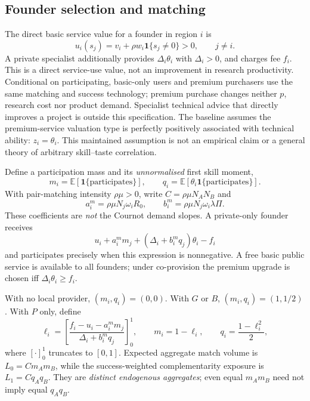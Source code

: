 \documentclass[11pt]{article}
\begin{document}
\subsection{Founder selection and matching}
The direct basic service value for a founder in region $i$ is
\begin{equation}
 u_i(s_j)=v_i+\rho w_i\mathbf1\{s_j\neq0\}>0,\qquad j\ne i.
\end{equation}
A private specialist additionally provides $\Delta_i\theta_i$ with $\Delta_i>0$, and charges fee $f_i$.
This is a direct service-use value, not an improvement in research productivity.
Conditional on participating, basic-only users and premium purchasers use the same matching and success technology; premium purchase changes neither $p$, research cost nor product demand.
Specialist technical advice that directly improves a project is outside this specification. The baseline assumes the premium-service valuation type is perfectly positively associated with technical ability: $z_i=\theta_i$. This maintained assumption is not an empirical claim or a general theory of arbitrary skill--taste correlation.

Define a participation mass and its \emph{unnormalised} first skill moment,
\begin{equation}
 m_i=\mathbb E[\mathbf1\{\mathrm{participates}\}],\qquad
 q_i=\mathbb E[\theta_i\mathbf1\{\mathrm{participates}\}].
 \label{eq:m-q}
\end{equation}
With pair-matching intensity $\rho\mu>0$, write $C=\rho\mu N_AN_B$ and
\begin{equation}
 a_i^m=\rho\mu N_j\omega_i R_0,\qquad
 b_i^m=\rho\mu N_j\omega_i\lambda\Pi.
 \label{eq:matchingcoeff}
\end{equation}
These coefficients are \emph{not} the Cournot demand slopes. A private-only founder receives
\begin{equation}
 u_i+a_i^m m_j+(\Delta_i+b_i^m q_j)\theta_i-f_i
 \label{eq:founderpayoff}
\end{equation}
and participates precisely when this expression is nonnegative. A free basic public service is available to all founders; under co-provision the premium upgrade is chosen iff $\Delta_i\theta_i\geq f_i$.

With no local provider, $(m_i,q_i)=(0,0)$. With $G$ or $B$, $(m_i,q_i)=(1,1/2)$. With $P$ only, define
\begin{equation}
 \ell_i=\left[\frac{f_i-u_i-a_i^m m_j}
                       {\Delta_i+b_i^m q_j}\right]_0^1,\qquad
 m_i=1-\ell_i,\qquad q_i=\frac{1-\ell_i^2}{2},
 \label{eq:participation}
\end{equation}
where $[\cdot]_0^1$ truncates to $[0,1]$. Expected aggregate match volume is
$L_0=Cm_Am_B$, while the success-weighted complementarity exposure is $L_1=Cq_Aq_B$. They are \emph{distinct endogenous aggregates}; even equal $m_A m_B$ need not imply equal $q_Aq_B$.
\end{document}
